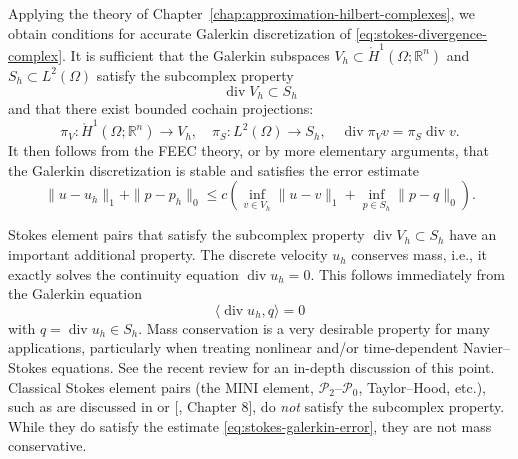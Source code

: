 {Applying the theory of Chapter~\ref{chap:approximation-hilbert-complexes}, we obtain conditions for accurate Galerkin discretization of \eqref{eq:stokes-divergence-complex}. It is sufficient that the Galerkin subspaces $V_h\subset\mathring H^1(\Omega;\mathbb R^n)$ and $S_h\subset L^2(\Omega)$ satisfy the subcomplex property}
\begin{equation}\label{eq:stokes-discrete-subcomplex}
\operatorname{div}V_h\subset S_h
\end{equation}
{and that there exist bounded cochain projections:}
\[
\pi_V:\mathring H^1(\Omega;\mathbb R^n)\to V_h,\quad\pi_S:L^2(\Omega)\to S_h,\quad\operatorname{div}\pi_Vv=\pi_S\operatorname{div}v.
\]
{It then follows from the FEEC theory, or by more elementary arguments, that the Galerkin discretization is stable and satisfies the error estimate}
\begin{equation}\label{eq:stokes-galerkin-error}
\|u-u_h\|_1+\|p-p_h\|_0\leq c\left(\inf_{v\in V_h}\|u-v\|_1+\inf_{p\in S_h}\|p-q\|_0\right).
\end{equation}

{Stokes element pairs that satisfy the subcomplex property $\operatorname{div}V_h\subset S_h$ have an important additional property. The discrete velocity $u_h$ conserves mass, i.e., it exactly solves the continuity equation $\operatorname{div}u_h=0$. This follows immediately from the Galerkin equation}
\[
\langle\operatorname{div}u_h,q\rangle=0
\]
{with $q=\operatorname{div}u_h\in S_h$. Mass conservation is a very desirable property for many applications, particularly when treating nonlinear and/or time-dependent Navier–Stokes equations. See the recent review  for an in-depth discussion of this point. Classical Stokes element pairs (the MINI element, $\mathcal P_2$--$\mathcal P_0$, Taylor–Hood, etc.), such as are discussed in  or [, Chapter 8], do \emph{not} satisfy the subcomplex property. While they do satisfy the estimate \eqref{eq:stokes-galerkin-error}, they are not mass conservative.}

